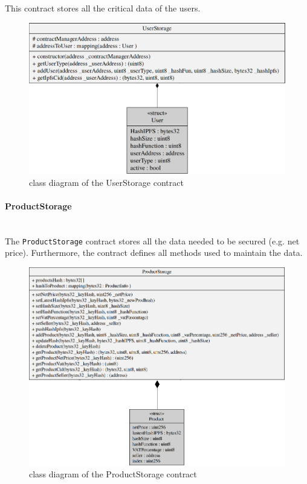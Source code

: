 \noindent This contract stores all the critical data of the users. 
\begin{figure}[H]
	\centering
	\includegraphics[scale=0.25]{res/images/solidity/userstorage.png}
	\caption{class diagram of the UserStorage contract}
\end{figure}
\pagebreak
\paragraph{ProductStorage}\mbox{}\\

\noindent The \texttt{ProductStorage} contract stores all the data needed to be secured (e.g. net price). Furthermore, the contract defines all methods used to maintain the data. 
\begin{figure}[H]
	\centering
	\includegraphics[scale=0.45]{res/images/solidity/productstorage.png}
	\caption{class diagram of the ProductStorage contract}
\end{figure}
\pagebreak

